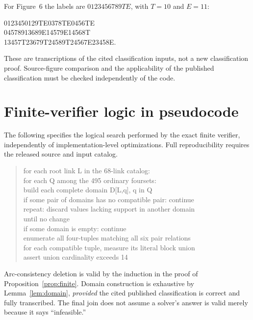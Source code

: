 \documentclass[11pt]{article}
\theoremstyle{definition}
\theoremstyle{remark}
\begin{document}
For Figure~6 the labels are $0123456789TE$, with $T=10$ and $E=11$:
\begin{center}\ttfamily\small
012345\quad 0129TE\quad 0378TE\quad 0456TE\\
045789\quad 13689E\quad 14579E\quad 14568T\\
13457T\quad 23679T\quad 24589T\quad 24567E\quad 23458E.
\end{center}
These are transcriptions of the cited classification inputs, not a new
classification proof. Source-figure comparison and the applicability of
the published classification must be checked independently of the code.

\section{Finite-verifier logic in pseudocode}\label{app:algorithm}
The following specifies the logical search performed by the exact
finite verifier, independently of implementation-level optimizations.
Full reproducibility requires the released source and input catalog.
\begin{quote}\small\ttfamily
for each root link L in the 68-link catalog:\\
\hspace*{1em}for each Q among the 495 ordinary foursets:\\
\hspace*{2em}build each complete domain D[L,q], q in Q\\
\hspace*{2em}if some pair of domains has no compatible pair: continue\\
\hspace*{2em}repeat: discard values lacking support in another domain\\
\hspace*{2em}until no change\\
\hspace*{2em}if some domain is empty: continue\\
\hspace*{2em}enumerate all four-tuples matching all six pair relations\\
\hspace*{2em}for each compatible tuple, measure its literal block union\\
\hspace*{2em}assert union cardinality exceeds 14
\end{quote}
Arc-consistency deletion is valid by the induction in the proof of
Proposition~\ref{prop:finite}. Domain construction is exhaustive by
Lemma~\ref{lem:domain}, \emph{provided} the cited published
classification is correct and fully transcribed. The final join does
not assume a solver's answer is valid merely because it says
``infeasible.''
\end{document}
